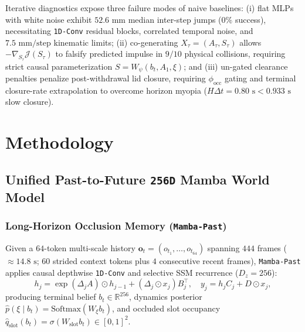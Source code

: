 \documentclass[letterpaper, 10pt, conference]{ieeeconf}
\begin{document}
Iterative diagnostics expose three failure modes of naive baselines: (i) flat MLPs with white noise exhibit $52.6\text{ mm}$ median inter-step jumps ($0\%$ success), necessitating \texttt{1D-Conv} residual blocks, correlated temporal noise, and $7.5\text{ mm/step}$ kinematic limits; (ii) co-generating $X_\tau = (A_\tau, S_\tau)$ allows $-\nabla_{S_\tau}\mathcal{J}(S_\tau)$ to falsify predicted impulse in $9/10$ physical collisions, requiring strict causal parameterization $S = W_\psi(b_t, A_1, \xi)$; and (iii) un-gated clearance penalties penalize post-withdrawal lid closure, requiring $\phi_{\text{occ}}$ gating and terminal closure-rate extrapolation to overcome horizon myopia ($H\Delta t = 0.80\text{ s} < 0.933\text{ s}$ slow closure).

\section{Methodology}

\subsection{Unified Past-to-Future \texttt{256D} Mamba World Model}
\subsubsection{Long-Horizon Occlusion Memory (\texttt{Mamba-Past})}
Given a $64$-token multi-scale history $\mathbf{o}_t = (o_{t_1}, \dots, o_{t_{64}})$ spanning $444$ frames ($\approx 14.8\text{ s}$; $60$ strided context tokens plus $4$ consecutive recent frames), \texttt{Mamba-Past} applies causal depthwise \texttt{1D-Conv} and selective SSM recurrence ($D_z = 256$):
\begin{equation}
    h_j = \exp(\Delta_j A) \odot h_{j-1} + (\Delta_j \odot x_j) B_j^\top, \quad y_j = h_j C_j + D \odot x_j,
\end{equation}
producing terminal belief $b_t \in \mathbb{R}^{256}$, dynamics posterior $\hat{p}(\xi \mid b_t) = \text{Softmax}(W_\xi b_t)$, and occluded slot occupancy $\hat{q}_{\text{slot}}(b_t) = \sigma(W_{\text{slot}} b_t) \in [0,1]^2$.
\end{document}
